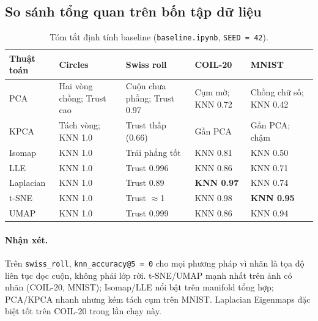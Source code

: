 \subsection{So sánh tổng quan trên bốn tập dữ liệu}

\begin{table}[H]
  \centering
  \caption{Tóm tắt định tính baseline (\texttt{baseline.ipynb}, \texttt{SEED = 42}).}
  \label{tab:summary-all-methods}
  \small
  \begin{tabular}{p{}p{}p{}p{}p{}}
    \toprule
    Thuật toán & Circles & Swiss roll & COIL-20 & MNIST \\
    \midrule
    PCA & Hai vòng chồng; Trust cao & Cuộn chưa phẳng; Trust 0.97 & Cụm mờ; KNN 0.72 & Chồng chữ số; KNN 0.42 \\
    KPCA & Tách vòng; KNN 1.0 & Trust thấp (0.66) & Gần PCA & Gần PCA; chậm \\
    Isomap & KNN 1.0 & Trải phẳng tốt & KNN 0.81 & KNN 0.50 \\
    LLE & KNN 1.0 & Trust 0.996 & KNN 0.86 & KNN 0.71 \\
    Laplacian & KNN 1.0 & Trust 0.89 & \textbf{KNN 0.97} & KNN 0.74 \\
    t-SNE & KNN 1.0 & Trust $\approx$1 & KNN 0.98 & \textbf{KNN 0.95} \\
    UMAP & KNN 1.0 & Trust 0.999 & KNN 0.86 & KNN 0.94 \\
    \bottomrule
  \end{tabular}
\end{table}

\paragraph{Nhận xét.}
Trên \texttt{swiss\_roll}, \texttt{knn\_accuracy@5 = 0} cho mọi phương pháp vì
nhãn là tọa độ liên tục dọc cuộn, không phải lớp rời. t-SNE/UMAP mạnh nhất trên
ảnh có nhãn (COIL-20, MNIST); Isomap/LLE nổi bật trên manifold tổng hợp; PCA/KPCA
nhanh nhưng kém tách cụm trên MNIST. Laplacian Eigenmaps đặc biệt tốt trên
COIL-20 trong lần chạy này.

